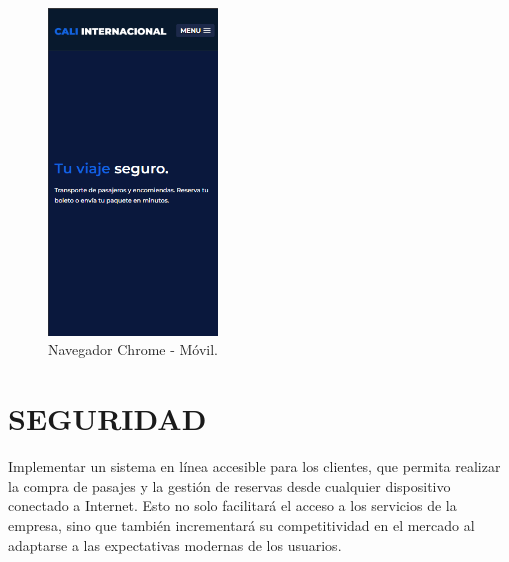 \vspace{6cm} %

\begin{figure}[!h] %
	\caption[Navegador Chrome - Móvil]
	{\newline Navegador Chrome - Móvil.} %
	\centering
	\includegraphics[width=0.4\textwidth]{imagenes/cap_3/celular.png} %
	
	\vspace{-16pt}
	\label{fig:figura_celular} %
\end{figure}

\vspace{0.3cm} %


\section{SEGURIDAD}

Implementar un sistema en línea accesible para los clientes, que permita realizar la compra de pasajes y la gestión de reservas desde cualquier dispositivo conectado a Internet. Esto no solo facilitará el acceso a los servicios de la empresa, sino que también incrementará su competitividad en el mercado al adaptarse a las expectativas modernas de los usuarios.

